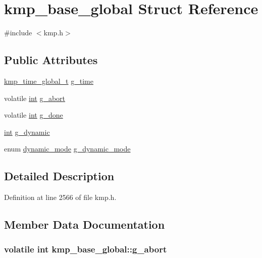 \hypertarget{structkmp__base__global}{\section{kmp\-\_\-base\-\_\-global Struct Reference}
\label{structkmp__base__global}
}


{\ttfamily \#include $<$kmp.\-h$>$}

\subsection*{Public Attributes}
\begin{DoxyCompactItemize}
\item 
\hyperlink{kmp_8h_a1d39c554f5c368c3be267e72cf234827}{kmp\-\_\-time\-\_\-global\-\_\-t} \hyperlink{structkmp__base__global_a761441e9b7be073b62ef0a2575edacd7}{g\-\_\-time}
\item 
volatile \hyperlink{ittnotify__static_8h_a8b8dcd723308a8cb5d84277c7a3fff70}{int} \hyperlink{structkmp__base__global_a00324016315ca4870ad3676359d29e1b}{g\-\_\-abort}
\item 
volatile \hyperlink{ittnotify__static_8h_a8b8dcd723308a8cb5d84277c7a3fff70}{int} \hyperlink{structkmp__base__global_aaf20619e3822842a92962506f4c18b97}{g\-\_\-done}
\item 
\hyperlink{ittnotify__static_8h_a8b8dcd723308a8cb5d84277c7a3fff70}{int} \hyperlink{structkmp__base__global_ae97c056c2befd4b0fe07a11d7eeb5b83}{g\-\_\-dynamic}
\item 
enum \hyperlink{kmp_8h_afad9dc14c1f4e31f03a77297c13e0853}{dynamic\-\_\-mode} \hyperlink{structkmp__base__global_a4954f98fc3d44f85315a09b4faceef3e}{g\-\_\-dynamic\-\_\-mode}
\end{DoxyCompactItemize}


\subsection{Detailed Description}


Definition at line 2566 of file kmp.\-h.



\subsection{Member Data Documentation}
\hypertarget{structkmp__base__global_a00324016315ca4870ad3676359d29e1b}{
\subsubsection[{g\-\_\-abort}]{\setlength{\rightskip}{0pt plus 5cm}volatile {\bf int} kmp\-\_\-base\-\_\-global\-::g\-\_\-abort}}\label{structkmp__base__global_a00324016315ca4870ad3676359d29e1b}


